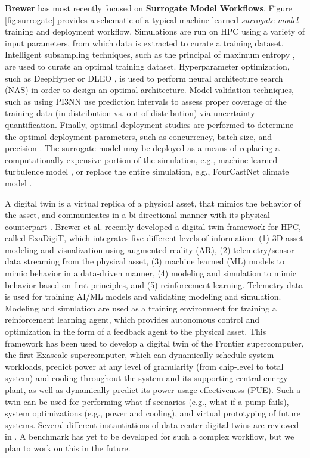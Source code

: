 \documentclass[utf8]{FrontiersinVancouver} %
\begin{document}



{\bf Brewer} has most recently focused on  {\bf Surrogate Model Workflows}. Figure \ref{fig:surrogate} provides a schematic of a typical machine-learned \textit{surrogate model} training and deployment workflow. Simulations are run on HPC using a variety of input parameters, from which data is extracted to curate a training dataset. Intelligent subsampling techniques, such as the principal of maximum entropy \cite{brewer2023entropy}, are used to curate an optimal training dataset. Hyperparameter optimization, such as DeepHyper \cite{balaprakash2018deephyper} or DLEO \cite{martinez2018deep}, is used to perform neural architecture search (NAS) in order to design an optimal architecture. Model validation techniques, such as using PI3NN \cite{liu2021pi3nn} use prediction intervals to assess proper coverage of the training data (in-distribution vs. out-of-distribution) via uncertainty quantification. Finally, optimal deployment studies are performed to determine the optimal deployment parameters, such as concurrency, batch size, and precision \cite{brewer2021production}. The surrogate model may be deployed as a means of replacing a computationally expensive portion of the simulation, e.g., machine-learned turbulence model \cite{bhushan2021development}, or replace the entire simulation, e.g., FourCastNet climate model \cite{pathak2022fourcastnet}.

A digital twin is a virtual replica of a physical asset, that mimics the behavior of the asset, and communicates in a bi-directional manner with its physical counterpart \cite{nas2023foundational}.   Brewer et al. \cite{brewer2024digital} recently developed a digital twin framework for HPC, called ExaDigiT, which integrates five different levels of information: (1) 3D asset modeling and visualization using augmented reality (AR), (2) telemetry/sensor data streaming from the physical asset, (3) machine learned (ML) models to mimic behavior in a data-driven manner, (4) modeling and simulation to mimic behavior based on first principles, and (5) reinforcement learning. Telemetry data is used for training AI/ML models and validating modeling and simulation. Modeling and simulation are used as a training environment for training a reinforcement learning agent, which provides autonomous control and optimization in the form of a feedback agent to the physical asset. This framework has been used to develop a digital twin of the Frontier supercomputer, the first Exascale supercomputer, which can dynamically schedule system workloads, predict power at any level of granularity (from chip-level to total system) and cooling throughout the system and its supporting central energy plant, as well as dynamically predict its power usage effectiveness (PUE). Such a twin can be used for performing what-if scenarios (e.g., what-if a pump fails), system optimizations (e.g., power and cooling), and virtual prototyping of future systems. Several different instantiations of data center digital twins are reviewed in \cite{athavale2024digital}. A benchmark has yet to be developed for such a complex workflow, but we plan to work on this in the future. 
\end{document}
